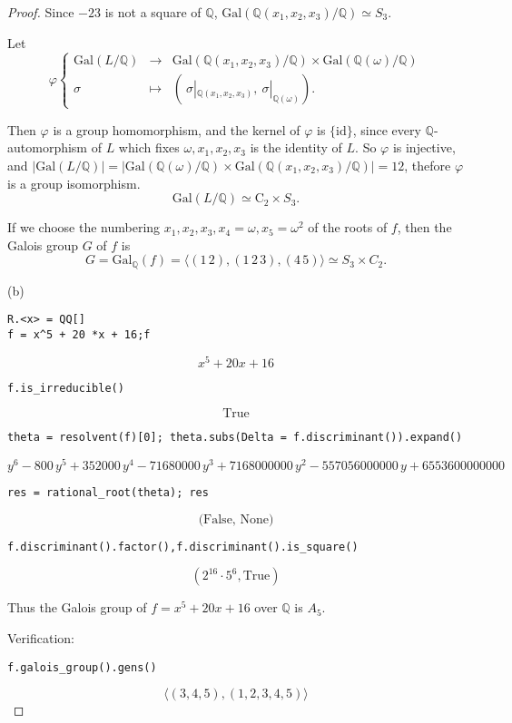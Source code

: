 \documentclass[11pt,a4paper]{article}
\newcommand{\Q}{\mathbb{Q}}
\newcommand{\Gal}{\mathrm{Gal}}
\begin{document}
\begin{proof}
Since $-23$ is not a square of $\Q$, $\Gal(\Q(x_1,x_2,x_3)/\Q) \simeq S_3$.

Let
$$
\varphi
\left\{
\begin{array}{ccc}
 \Gal(L/\Q) & \to   &\Gal(\Q(x_1,x_2,x_3)/\Q)  \times  \Gal(\Q(\omega)/\Q)  \\
 \sigma & \mapsto  &    \left (\ \sigma|_{\Q(x_1,x_2,x_3)},\ \sigma |_{\Q(\omega)}\right).
\end{array}
\right.
$$

Then $\varphi$ is a group homomorphism, and the kernel of $\varphi$ is $\{\mathrm{id}\}$, since every $\Q$-automorphism of $L$ which fixes $\omega,x_1,x_2,x_3$ is the identity of $L$.
So $\varphi$ is injective, and $|\Gal(L/\Q)| = |\Gal(\Q(\omega)/\Q) \times \Gal(\Q(x_1,x_2,x_3)/\Q)| = 12$, thefore $\varphi$ is a group isomorphism.
$$\Gal(L/\Q) \simeq \mathrm{C}_2 \times S_3.$$

If we choose the numbering $x_1,x_2,x_3,x_4 = \omega, x_5 = \omega^2$ of the roots of $f$, then the Galois group $G$ of $f$ is
$$G = \Gal_{\Q}(f) = \langle (1\, 2), (1\,2\,3), (4 \, 5) \rangle \simeq S_3 \times C_2.$$

\item[(b)] 
\begin{verbatim}
R.<x> = QQ[]
f = x^5 + 20 *x + 16;f
\end{verbatim}
$$	
x^{5} + 20 x + 16
$$
\begin{verbatim}
f.is_irreducible()
\end{verbatim}
$$\text{True}$$
\begin{verbatim}
theta = resolvent(f)[0]; theta.subs(Delta = f.discriminant()).expand()
\end{verbatim}
$$y^{6} - 800 \, y^{5} + 352000 \, y^{4} - 71680000 \, y^{3} + 7168000000
\, y^{2} - 557056000000 \, y + 6553600000000
$$
\begin{verbatim}
res = rational_root(theta); res
\end{verbatim}
$$\text{(False, None)}$$
\begin{verbatim}
f.discriminant().factor(),f.discriminant().is_square()
\end{verbatim}

$$(2^{16} \cdot 5^{6}, \text{True})$$

Thus the Galois group of $f = x^5+20x+16$ over $\Q$ is $A_5$.

Verification:
\begin{verbatim}
f.galois_group().gens()
\end{verbatim}
$$\langle(3,4,5),(1,2,3,4,5)\rangle$$


\end{proof}
\end{document}
